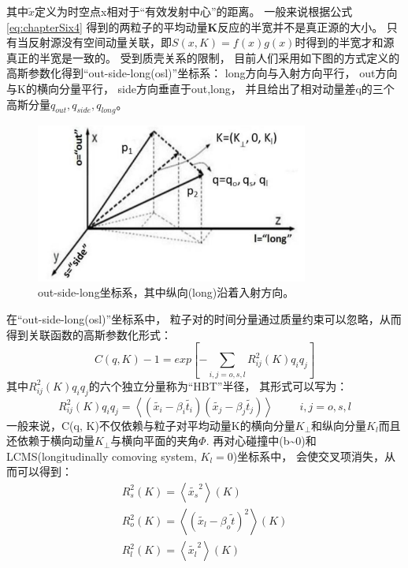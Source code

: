 其中$\widetilde{x}$定义为时空点x相对于\textquotedblleft{有效发射中心}\textquotedblright{}的距离。%
一般来说根据公式\ref{eq:chapterSix4}
得到的两粒子的平均动量\textbf{K}反应的半宽并不是真正源的大小。%
只有当反射源没有空间动量关联，即$S(x, K) = f(x)g(x)$时得到的半宽才和源真正的半宽是一致的。%
受到质壳关系的限制，%
目前人们采用如下图的方式定义的高斯参数化得到\textquotedblleft{out-side-long}(osl)\textquotedblright{}坐标系：%
long方向与入射方向平行，%
out方向与K的横向分量平行，%
side方向垂直于out,long，%
并且给出了相对动量差q的三个高斯分量$q_{out}, q_{side}, q_{long}$。
\begin{figure}[hbtp]
  \centering
  \includegraphics[width=0.8\textwidth]{./chapter06/images/hbt}
  \caption{out-side-long坐标系，其中纵向(long)沿着入射方向。}
  \label{fig:hbt-coordinate}
\end{figure}
在\textquotedblleft{out-side-long(osl)}\textquotedblright{}坐标系中，%
粒子对的时间分量通过质量约束可以忽略，从而得到关联函数的高斯参数化形式：%
\begin{equation}
  \label{eq:chapterSix7}
  C(q, K) - 1 = exp[-\sum_{i,j=o,s,l}R_{ij}^{2}(K)q_{i}q_{j}]
\end{equation}
其中$R_{ij}^{2}(K)q_{i}q_{j}$的六个独立分量称为\textquotedblleft{HBT}\textquotedblright{}半径，%
其形式可以写为：
\begin{equation}
  \label{eq:chapterSix7}
  R_{ij}^{2}(K)q_{i}q_{j} = \left<(\widetilde{x_{i}}-\beta_{i}\widetilde{t_{i}})(\widetilde{x_{j}}-\beta_{j}\widetilde{t_{j}})\right>    \hspace{1cm} i, j = o, s, l
\end{equation}
一般来说，C(q, K)不仅依赖与粒子对平均动量K的横向分量$K_{\perp}$和纵向分量$K_{l}$而且还依赖于横向动量$K_{\perp}$与横向平面的夹角$\Phi$.%
再对心碰撞中(b\~{}0)和LCMS(longitudinally comoving system, $K_{l}=0$)坐标系中，%
会使交叉项消失，从而可以得到：%
\begin{gather}
  R_{s}^{2}(K) = \left< \widetilde{x_{s}}^{2}\right>(K) \\
  R_{o}^{2}(K) = \left< (\widetilde{x_{l}}-\beta_{o}\widetilde{t})^{2} \right>(K) \\
  R_{l}^{2}(K) = \left< \widetilde{x_{l}}^{2} \right>(K)
\end{gather}

